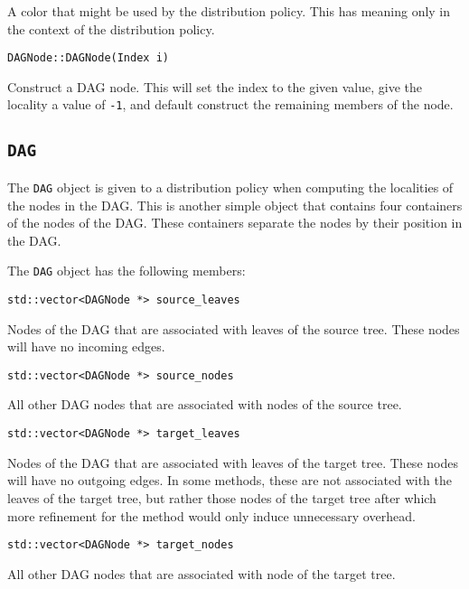 A color that might be used by the distribution policy. This has meaning only
in the context of the distribution policy.

\begin{lstlisting}
DAGNode::DAGNode(Index i)
\end{lstlisting}


Construct a DAG node. This will set the index to the given value, give the
locality a value of \texttt{-1}, and default construct the remaining members
of the node.


\subsection{\texttt{DAG}}

The \texttt{DAG} object is given to a distribution policy when computing the
localities of the nodes in the DAG. This is another simple object that contains
four containers of the nodes of the DAG. These containers separate the nodes
by their position in the DAG.

The \texttt{DAG} object has the following members:

\begin{lstlisting}
std::vector<DAGNode *> source_leaves
\end{lstlisting}


Nodes of the DAG that are associated with leaves of the source tree. These
nodes will have no incoming edges.

\begin{lstlisting}
std::vector<DAGNode *> source_nodes
\end{lstlisting}


All other DAG nodes that are associated with nodes of the source tree.

\begin{lstlisting}
std::vector<DAGNode *> target_leaves
\end{lstlisting}


Nodes of the DAG that are associated with leaves of the target tree. These
nodes will have no outgoing edges. In some methods, these are not associated
with the leaves of the target tree, but rather those nodes of the target
tree after which more refinement for the method would only induce
unnecessary overhead.

\begin{lstlisting}
std::vector<DAGNode *> target_nodes
\end{lstlisting}


All other DAG nodes that are associated with node of the target tree.



